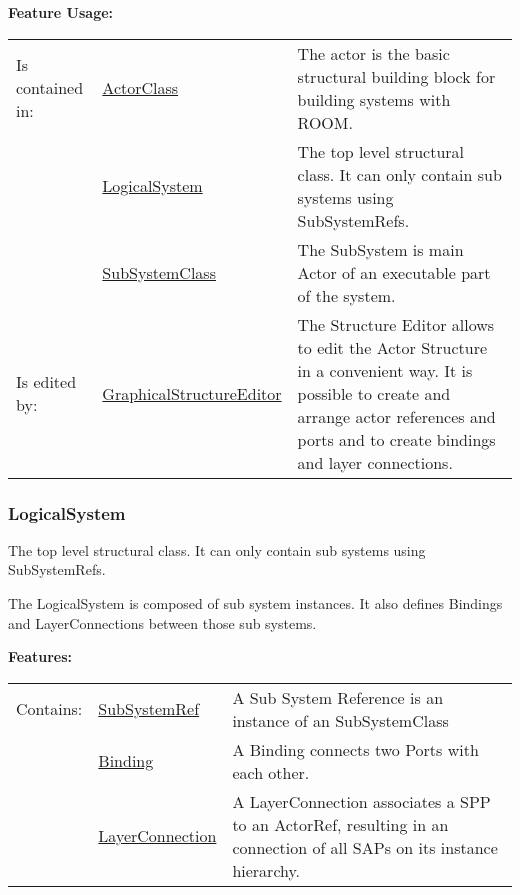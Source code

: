 		\begingroup
		\textbf{Feature Usage:}
		\renewcommand{\arraystretch}{1.8} %
		\begin{longtable}{l|l p{}}
			\hline
		Is contained in: & \tabitem \hyperlink{ref:ActorClass}{ActorClass}  & The actor is the basic structural building block for building systems with ROOM.\\
		& \tabitem \hyperlink{ref:LogicalSystem}{LogicalSystem}  & The top level structural class. It can only contain sub systems using SubSystemRefs. \\
		& \tabitem \hyperlink{ref:SubSystemClass}{SubSystemClass}  & The SubSystem is main Actor of an executable part of the system.  \\
		\hline
		Is edited by: & \tabitem \hyperlink{ref:GraphicalStructureEditor}{GraphicalStructureEditor}  & The Structure Editor allows to edit the Actor Structure in a convenient way. It is possible to create and arrange actor references and ports and to create bindings and layer connections.\\
		\hline
		\end{longtable}
		\endgroup
		
		
	\vspace{\baselineskip}
	\vspace{\baselineskip}
	\vspace{\baselineskip}
	
	\subsubsection{LogicalSystem}
		\hypertarget{ref:LogicalSystem}{}
		
		The top level structural class. It can only contain sub systems using SubSystemRefs.
		
		The LogicalSystem is composed of sub system instances. It also defines Bindings and LayerConnections between those sub systems. 
		
		
		\begingroup
		\textbf{Features:}
		\renewcommand{\arraystretch}{1.8} %
		\begin{longtable}{l|l p{}}
			\hline
		Contains: & \tabitem \hyperlink{ref:SubSystemRef}{SubSystemRef}  & A Sub System Reference is an instance of an SubSystemClass\\
		& \tabitem \hyperlink{ref:Binding}{Binding}  & A Binding connects two Ports with each other. \\
		& \tabitem \hyperlink{ref:LayerConnection}{LayerConnection}  & A LayerConnection associates a SPP to an ActorRef, resulting in an connection of all SAPs on its instance hierarchy. \\
		\hline
		\end{longtable}
		\endgroup
		
